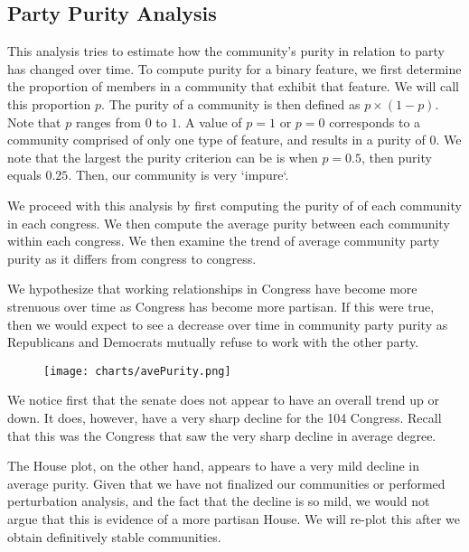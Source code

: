 \subsection{Party Purity Analysis}

This analysis tries to estimate how the community's purity in relation to party
has changed over time. To compute purity for a binary feature, we first
determine the proportion of members in a community that exhibit that feature. We
will call this proportion $p$. The purity of a community is then defined as $p
\times (1 - p)$. Note that $p$ ranges from $0$ to $1$. A value of $p = 1$ or $p
= 0$ corresponds to a community comprised of only one type of feature, and
results in a purity of $0$. We note that the largest the purity criterion can be
is when $p = 0.5$, then purity equals $0.25$. Then, our community is very
`impure`.

We proceed with this analysis by first computing the purity of of each community
in each congress. We then compute the average purity between each community
within each congress. We then examine the trend of average community party
purity as it differs from congress to congress.

We hypothesize that working relationships in Congress have become more strenuous
over time as Congress has become more partisan. If this were true, then we would
expect to see a decrease over time in community party purity as Republicans and
Democrats mutually refuse to work with the other party.

\begin{figure}[h!]
    \texttt{[image: charts/avePurity.png]}
\end{figure}

We notice first that the senate does not appear to have an overall trend up or
down. It does, however, have a very sharp decline for the 104 Congress. Recall
that this was the Congress that saw the very sharp decline in average degree.

The House plot, on the other hand, appears to have a very mild decline in
average  purity. Given that we have not finalized our communities or performed
perturbation analysis, and the fact that the decline is so mild, we would not
argue that this is evidence of a more partisan House. We will re-plot this after 
we obtain definitively stable communities.